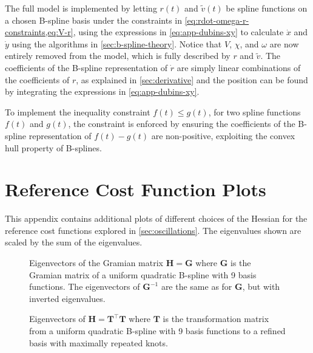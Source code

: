 The full model is implemented by letting $r(t)$ and $\tilde v(t)$ be spline functions on a chosen B-spline basis under the constraints in \cref{eq:rdot-omega-r-constraints,eq:V-r}, using the expressions in \cref{eq:app-dubins-xy} to calculate $\dot x$ and $\dot y$ using the algorithms in \cref{sec:b-spline-theory}. Notice that $V$, $\chi$, and $\omega$ are now entirely removed from the model, which is fully described by $r$ and $\tilde v$. The coefficients of the B-spline representation of $\dot r$ are simply linear combinations of the coefficients of $r$, as explained in \cref{sec:derivative} and the position can be found by integrating the expressions in \cref{eq:app-dubins-xy}.

To implement the inequality constraint $f(t) \le g(t)$, for two spline functions $f(t)$ and $g(t)$, the constraint is enforced by ensuring the coefficients of the B-spline representation of $f(t) - g(t)$ are non-positive, exploiting the convex hull property of B-splines. 




\chapter{Reference Cost Function Plots}\label{app:reference-cost-plots}


This appendix contains additional plots of different choices of the Hessian for the reference cost functions explored in \cref{sec:oscillations}. The eigenvalues shown are scaled by the sum of the eigenvalues.

\begin{figure}
    \centering
    
    \caption{Eigenvectors of the Gramian matrix $\mathbf H = \mathbf G$ where $\mathbf G$ is the Gramian matrix of a uniform quadratic B-spline with 9 basis functions. The eigenvectors of $\mathbf G^{-1}$ are the same as for $\mathbf G$, but with inverted eigenvalues.}
    \label{fig:integral-basis-eigenvectors-9}
\end{figure}


\begin{figure}
    \centering
    
    \caption{Eigenvectors of $\mathbf H = \mathbf T^\top \mathbf T$ where $\mathbf T$ is the transformation matrix from a uniform quadratic B-spline with 9 basis functions to a refined basis with maximally repeated knots.}
    \label{fig:refined-basis-eigenvectors-9}
\end{figure} 

